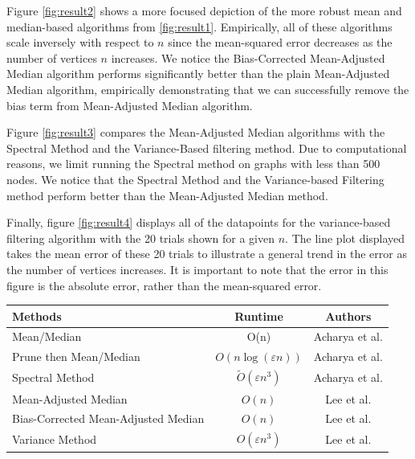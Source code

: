\documentclass[10pt,onecolumn,letterpaper]{article}
\newcommand{\eps}{\varepsilon}
\begin{document}
Figure \ref{fig:result2} shows a more focused depiction of the more robust mean and median-based algorithms from \ref{fig:result1}. Empirically, all of these algorithms scale inversely with respect to $n$ since the mean-squared error decreases as the number of vertices $n$ increases. We notice the Bias-Corrected Mean-Adjusted Median algorithm performs significantly better than the plain Mean-Adjusted Median algorithm, empirically demonstrating that we can successfully remove the bias term from Mean-Adjusted Median algorithm.

Figure \ref{fig:result3} compares the Mean-Adjusted Median algorithms with the Spectral Method and the Variance-Based filtering method. Due to computational reasons, we limit running the Spectral method on graphs with less than 500 nodes. We notice that the Spectral Method and the Variance-based Filtering method perform better than the Mean-Adjusted Median method. 

Finally, figure \ref{fig:result4} displays all of the datapoints for the variance-based filtering algorithm with the 20 trials shown for a given $n$. The line plot displayed takes the mean error of these 20 trials to illustrate a general trend in the error as the number of vertices increases. It is important to note that the error in this figure is the absolute error, rather than the mean-squared error.

\begin{table}[ht]
    \centering
    \begin{tabular}{lcc}
        \textbf{Methods} & \textbf{Runtime} & \textbf{Authors}\\
        \hline
        {Mean/Median} & O(n) & Acharya et al.\\
        {Prune then Mean/Median} & $O(n\log(\eps n))$ & Acharya et al.\\
        {Spectral Method} & $\tilde{O}\left(\eps n^3\right)$ & Acharya et al.\\
        {Mean-Adjusted Median} & $O(n)$ & Lee et al.\\
        {Bias-Corrected Mean-Adjusted Median} & $O(n)$ & Lee et al.\\
        {Variance Method} & $O(\eps n^3)$ & Lee et al.\\
    \end{tabular}
    \label{tab:runtimes}
\end{table}
\end{document}
